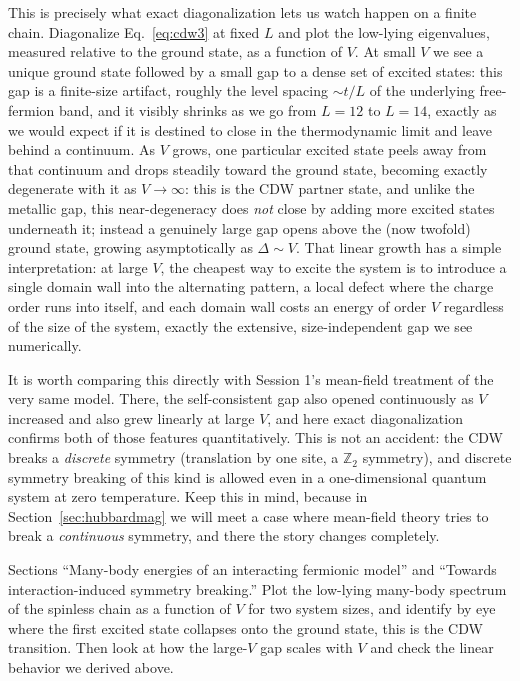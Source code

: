 \documentclass[all_sessions.tex]{subfiles}
\begin{document}
This is precisely what exact diagonalization lets us watch happen on a finite chain. Diagonalize
Eq.~\eqref{eq:cdw3} at fixed $L$ and plot the low-lying eigenvalues, measured relative to the
ground state, as a function of $V$. At small $V$ we see a unique ground state followed by a small
gap to a dense set of excited states: this gap is a finite-size artifact, roughly the level
spacing $\sim t/L$ of the underlying free-fermion band, and it visibly shrinks as we go from
$L=12$ to $L=14$, exactly as we would expect if it is destined to close in the thermodynamic limit
and leave behind a continuum. As $V$ grows, one particular excited state peels away from that
continuum and drops steadily toward the ground state, becoming exactly degenerate with it as
$V\to\infty$: this is the CDW partner state, and unlike the metallic gap, this near-degeneracy
does \emph{not} close by adding more excited states underneath it; instead a genuinely large gap
opens above the (now twofold) ground state, growing asymptotically as $\Delta \sim V$. That linear
growth has a simple interpretation: at large $V$, the cheapest way to excite the system is to
introduce a single domain wall into the alternating pattern, a local defect where the charge order
runs into itself, and each domain wall costs an energy of order $V$ regardless of the size of the
system, exactly the extensive, size-independent gap we see numerically.

It is worth comparing this directly with Session 1's mean-field treatment of the very same model.
There, the self-consistent gap also opened continuously as $V$ increased and also grew linearly at
large $V$, and here exact diagonalization confirms both of those features quantitatively. This is
not an accident: the CDW breaks a \emph{discrete} symmetry (translation by one site, a $\mathbb Z_2$
symmetry), and discrete symmetry breaking of this kind is allowed even in a one-dimensional quantum
system at zero temperature. Keep this in mind, because in Section~\ref{sec:hubbardmag} we will meet
a case where mean-field theory tries to break a \emph{continuous} symmetry, and there the story
changes completely.

\begin{notebook}
Sections ``Many-body energies of an interacting fermionic model'' and ``Towards
interaction-induced symmetry breaking.'' Plot the low-lying many-body spectrum of the spinless
chain as a function of $V$ for two system sizes, and identify by eye where the first excited state
collapses onto the ground state, this is the CDW transition. Then look at how the large-$V$ gap
scales with $V$ and check the linear behavior we derived above.
\end{notebook}
\end{document}
